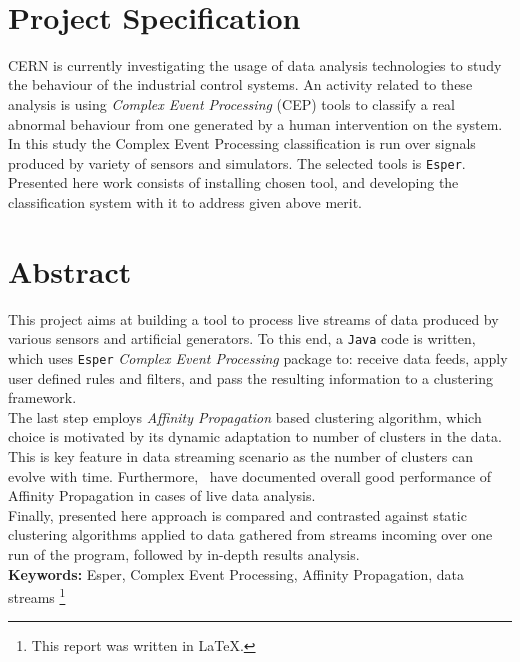 \documentclass[11pt, letterpaper]{article}            %
\begin{document}
~
\thispagestyle{empty}\newpage

\section*{Project Specification}
CERN is currently investigating the usage of data analysis technologies to study the behaviour of the industrial control systems. An activity related to these analysis is using \emph{Complex Event Processing} (CEP) tools to classify a real abnormal behaviour from one generated by a human intervention on the system.\\
In this study the Complex Event Processing classification is run over signals produced by variety of sensors and simulators. The selected tools is \texttt{Esper}. Presented here work consists of installing chosen tool, and developing the classification system with it to address given above merit.
\newpage

\section*{Abstract}
This project aims at building a tool to process live streams of data produced by various sensors and artificial generators. To this end, a \texttt{Java} code is written, which uses \texttt{Esper} \emph{Complex Event Processing} package to: receive data feeds, apply user defined rules and filters, and pass the resulting information to a clustering framework.\\
The last step employs \emph{Affinity Propagation} based clustering algorithm, which choice is motivated by its dynamic adaptation to number of clusters in the data. This is key feature in data streaming scenario as the number of clusters can evolve with time. Furthermore,~\citep{zhang2013data} have documented overall good performance of Affinity Propagation in cases of live data analysis.\\
Finally, presented here approach is compared and contrasted against static clustering algorithms applied to data gathered from streams incoming over one run of the program, followed by in-depth results analysis.\\[1cm]
\textbf{Keywords:} Esper, Complex Event Processing, Affinity Propagation, data streams
\let\thefootnote\relax\footnote{\noindent This report was written in \LaTeX.}\\
\newpage

{\fontsize{11}{13}\sffamily\linespread{1.750}\selectfont\tableofcontents}
\thispagestyle{fancy}\newpage
\end{document}
